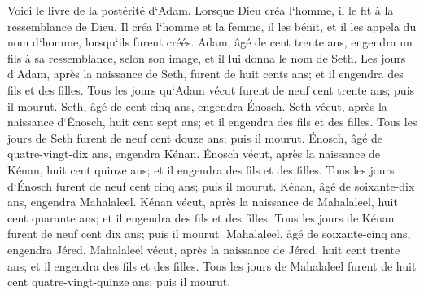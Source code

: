 \verse Voici le livre de la postérité d`Adam. Lorsque Dieu créa l`homme, il le fit à la ressemblance de Dieu. 
\verse Il créa l`homme et la femme, il les bénit, et il les appela du nom d`homme, lorsqu`ils furent créés. 
\verse Adam, âgé de cent trente ans, engendra un fils à sa ressemblance, selon son image, et il lui donna le nom de Seth. 
\verse Les jours d`Adam, après la naissance de Seth, furent de huit cents ans; et il engendra des fils et des filles. 
\verse Tous les jours qu`Adam vécut furent de neuf cent trente ans; puis il mourut. 
\verse Seth, âgé de cent cinq ans, engendra Énosch. 
\verse Seth vécut, après la naissance d`Énosch, huit cent sept ans; et il engendra des fils et des filles. 
\verse Tous les jours de Seth furent de neuf cent douze ans; puis il mourut. 
\verse Énosch, âgé de quatre-vingt-dix ans, engendra Kénan. 
\verse Énosch vécut, après la naissance de Kénan, huit cent quinze ans; et il engendra des fils et des filles. 
\verse Tous les jours d`Énosch furent de neuf cent cinq ans; puis il mourut. 
\verse Kénan, âgé de soixante-dix ans, engendra Mahalaleel. 
\verse Kénan vécut, après la naissance de Mahalaleel, huit cent quarante ans; et il engendra des fils et des filles. 
\verse Tous les jours de Kénan furent de neuf cent dix ans; puis il mourut. 
\verse Mahalaleel, âgé de soixante-cinq ans, engendra Jéred. 
\verse Mahalaleel vécut, après la naissance de Jéred, huit cent trente ans; et il engendra des fils et des filles. 
\verse Tous les jours de Mahalaleel furent de huit cent quatre-vingt-quinze ans; puis il mourut. 
